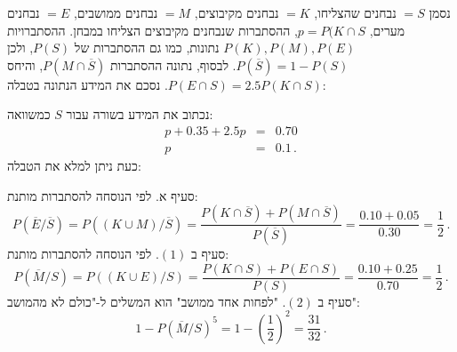 \documentclass[12pt,a4paper]{article}
\newcommand{\bover}[1]{\bm{\overline{#1}}}
\begin{document}
נסמן 
$=S$
נבחנים שהצליחו,
$=K$
נבחנים מקיבוצים,
$=M$
נבחנים ממושבים,
$=E$
נבחנים מערים,
$p=P(K\cap S$,
ההסתברות שנבחנים מקיבוצים הצליחו במבחן. ההסתברויות
$P(K),P(M),P(E)$
נתונות, כמו גם ההסתברות של
$P(S)$,
ולכן 
$P(\overline{S})=1-P(S)$.
לבסוף, נתונה ההסתברות
$P(M\cap \overline{S})$,
והיחס
$P(E\cap S)=2.5P(K\cap S)$.
נסכם את המידע הנתונה בטבלה:
\begin{center}
\end{center}
נכתוב את המידע בשורה עבור
$S$
כמשוואה:
\begin{eqnarray*}
p+0.35+2.5p&=&0.70\\
p&=&0.1\,.
\end{eqnarray*}
כעת ניתן למלא את הטבלה:
\begin{center}
\end{center}
סעיף א. לפי הנוסחה להסתברות מותנת:
\[
P(\overline{E}/\overline{S})=P((K\cup M)/\overline{S}) = \frac{P(K\cap \overline{S})+P(M\cap \overline{S})}{P(\overline{S})}=\frac{0.10+0.05}{0.30}=\frac{1}{2}\,.
\]
סעיף ב
$(1)$.
לפי הנוסחה להסתברות מותנת:
\[
P(\overline{M}/S)=P((K\cup E)/S) = \frac{P(K\cap S)+P(E\cap S)}{P(S)}=\frac{0.10+0.25}{0.70}=\frac{1}{2}\,.
\]
סעיף ב
$(2)$.
"לפחות אחד ממושב" הוא המשלים ל-"כולם לא מהמושב":
\[
1-P(\overline{M}/S)^5=1-\left(\frac{1}{2}\right)^2=\frac{31}{32}\,.
\]
\end{document}
